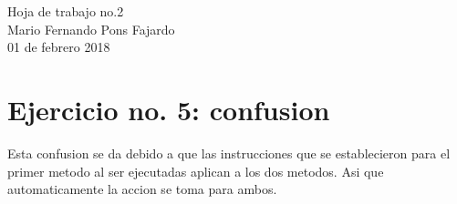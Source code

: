 \documentclass[10pt,a4paper]{article}
\begin{document}
\begin{center}
\huge {Hoja de trabajo no.2} \\
\large {Mario Fernando Pons Fajardo} \\
\large {01 de febrero 2018}

\end{center}

\section*{Ejercicio no. 5: confusion}
Esta confusion se da debido a que las instrucciones que se establecieron para el primer metodo al ser ejecutadas aplican a los dos metodos. Asi que automaticamente la accion se toma para ambos.
 
\end{document}
